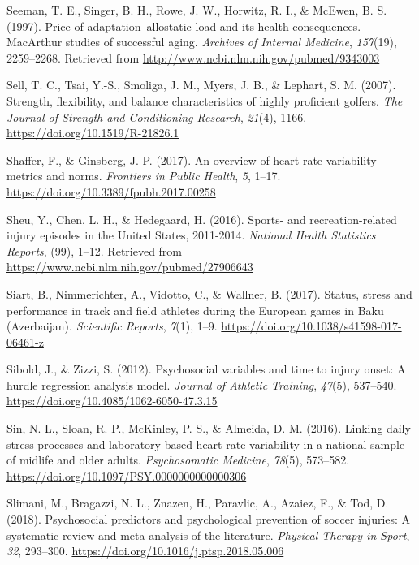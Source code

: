 \documentclass[
  english,
  man,floatsintext]{apa6}
\begin{document}
\leavevmode\hypertarget{ref-Seeman1997}{}%
Seeman, T. E., Singer, B. H., Rowe, J. W., Horwitz, R. I., \& McEwen, B. S. (1997). Price of adaptation--allostatic load and its health consequences. MacArthur studies of successful aging. \emph{Archives of Internal Medicine}, \emph{157}(19), 2259--2268. Retrieved from \url{http://www.ncbi.nlm.nih.gov/pubmed/9343003}

\leavevmode\hypertarget{ref-Sell2007}{}%
Sell, T. C., Tsai, Y.-S., Smoliga, J. M., Myers, J. B., \& Lephart, S. M. (2007). Strength, flexibility, and balance characteristics of highly proficient golfers. \emph{The Journal of Strength and Conditioning Research}, \emph{21}(4), 1166. \url{https://doi.org/10.1519/R-21826.1}

\leavevmode\hypertarget{ref-Shaffer2017}{}%
Shaffer, F., \& Ginsberg, J. P. (2017). An overview of heart rate variability metrics and norms. \emph{Frontiers in Public Health}, \emph{5}, 1--17. \url{https://doi.org/10.3389/fpubh.2017.00258}

\leavevmode\hypertarget{ref-Sheu2016}{}%
Sheu, Y., Chen, L. H., \& Hedegaard, H. (2016). Sports- and recreation-related injury episodes in the United States, 2011-2014. \emph{National Health Statistics Reports}, (99), 1--12. Retrieved from \url{https://www.ncbi.nlm.nih.gov/pubmed/27906643}

\leavevmode\hypertarget{ref-Siart2017}{}%
Siart, B., Nimmerichter, A., Vidotto, C., \& Wallner, B. (2017). Status, stress and performance in track and field athletes during the European games in Baku (Azerbaijan). \emph{Scientific Reports}, \emph{7}(1), 1--9. \url{https://doi.org/10.1038/s41598-017-06461-z}

\leavevmode\hypertarget{ref-Sibold2012}{}%
Sibold, J., \& Zizzi, S. (2012). Psychosocial variables and time to injury onset: A hurdle regression analysis model. \emph{Journal of Athletic Training}, \emph{47}(5), 537--540. \url{https://doi.org/10.4085/1062-6050-47.3.15}

\leavevmode\hypertarget{ref-Sin2016}{}%
Sin, N. L., Sloan, R. P., McKinley, P. S., \& Almeida, D. M. (2016). Linking daily stress processes and laboratory-based heart rate variability in a national sample of midlife and older adults. \emph{Psychosomatic Medicine}, \emph{78}(5), 573--582. \url{https://doi.org/10.1097/PSY.0000000000000306}

\leavevmode\hypertarget{ref-Slimani2018}{}%
Slimani, M., Bragazzi, N. L., Znazen, H., Paravlic, A., Azaiez, F., \& Tod, D. (2018). Psychosocial predictors and psychological prevention of soccer injuries: A systematic review and meta-analysis of the literature. \emph{Physical Therapy in Sport}, \emph{32}, 293--300. \url{https://doi.org/10.1016/j.ptsp.2018.05.006}
\end{document}
